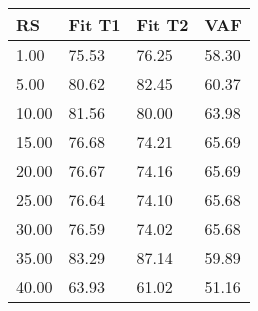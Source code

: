 \begin{tabular}{llll}
RS & Fit T1 & Fit T2 & VAF \\ 
\hline 
 1.00 & 75.53 & 76.25 & 58.30 \\ 
 5.00 & 80.62 & 82.45 & 60.37 \\ 
10.00 & 81.56 & 80.00 & 63.98 \\ 
15.00 & 76.68 & 74.21 & 65.69 \\ 
20.00 & 76.67 & 74.16 & 65.69 \\ 
25.00 & 76.64 & 74.10 & 65.68 \\ 
30.00 & 76.59 & 74.02 & 65.68 \\ 
35.00 & 83.29 & 87.14 & 59.89 \\ 
40.00 & 63.93 & 61.02 & 51.16 \\ 
\hline 
\end{tabular}